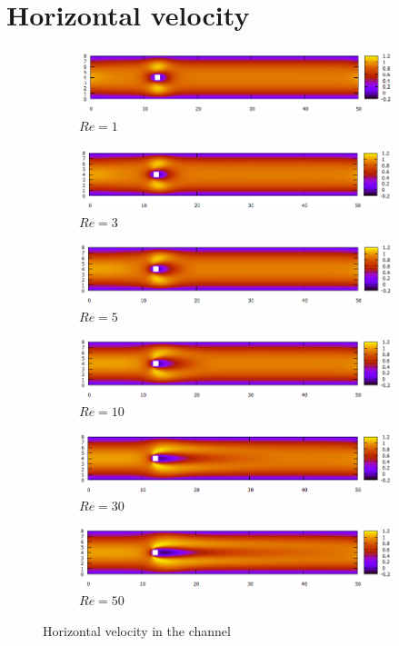 \section{Horizontal velocity}
\begin{figure}[H]
	\begin{subfigure}{\textwidth}
		\centering
		\includegraphics[width=.8\linewidth]{Square/totu1}
		\caption{$Re=1$}
	\end{subfigure}
	\begin{subfigure}{\textwidth}
		\centering
		\includegraphics[width=.8\linewidth]{Square/totu3}
		\caption{$Re=3$}
	\end{subfigure}
	\begin{subfigure}{\textwidth}
		\centering
		\includegraphics[width=.8\linewidth]{Square/totu5}
		\caption{$Re=5$}
	\end{subfigure}
	\begin{subfigure}{\textwidth}
		\centering
		\includegraphics[width=.8\linewidth]{Square/totu10}
		\caption{$Re=10$}
	\end{subfigure}
	\begin{subfigure}{\textwidth}
		\centering
		\includegraphics[width=.8\linewidth]{Square/totu30}
		\caption{$Re=30$}
	\end{subfigure}
	\begin{subfigure}{\textwidth}
		\centering
		\includegraphics[width=.8\linewidth]{Square/totu50}
		\caption{$Re=50$}
	\end{subfigure}
\caption{Horizontal velocity in the channel}
\end{figure}

